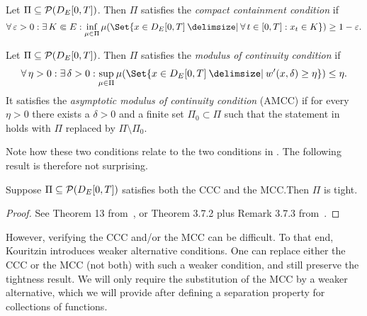 \begin{definition}[CCC]\label{def:CCC}
  Let \( \Pi \subseteq \mathcal{P}(D_{E}[0,T]) \).
  Then \( \Pi \) satisfies the \textit{compact containment condition} if
  \begin{equation}
    \forall \eps > 0 : \exists K \Subset E : \inf_{\mu \in \Pi} \mu(\Set{x \in D_E[0,T] \given \forall t \in [0,T] : x_t \in K}) \geq 1 - \eps.
  \end{equation}
\end{definition}

\begin{definition}[MCC]\label{def:MCC}
  Let \( \Pi \subseteq \mathcal{P}(D_{E}[0,T]) \).
  Then \( \Pi \) satisfies the \textit{modulus of continuity condition} if
  \begin{equation}\label{eq:MCC}
    \forall \eta > 0 : \exists \delta > 0 : \sup_{\mu \in \Pi} \mu(\Set{x \in D_E[0,T] \given w'(x,\delta) \geq \eta}) \leq \eta.
  \end{equation}
  It satisfies the \textit{asymptotic modulus of continuity condition} (AMCC) if for every \( \eta > 0 \) there exists a \( \delta > 0 \) and a finite set \( \Pi_0 \subset \Pi \) such that the statement in  holds with \( \Pi \) replaced by \( \Pi \setminus \Pi_0 \).
\end{definition}

Note how these two conditions relate to the two conditions in .
The following result is therefore not surprising.

\begin{theorem}
  Suppose \( \Pi \subseteq \mathcal{P}(D_{E}[0,T]) \) satisfies both the CCC and the MCC.\@ Then \( \Pi \) is tight.
\end{theorem}

\begin{proof}
  See Theorem 13 from~\cite{kouritzinTightnessProbabilityMeasures2015}, or Theorem 3.7.2 plus Remark 3.7.3 from~\cite{ethierMarkovProcessesCharacterization1985}.
\end{proof}

However, verifying the CCC and/or the MCC can be difficult.
To that end, Kouritzin introduces weaker alternative conditions.
One can replace either the CCC or the MCC (not both) with such a weaker condition, and still preserve the tightness result.
We will only require the substitution of the MCC by a weaker alternative, which we will provide after defining a separation property for collections of functions.

